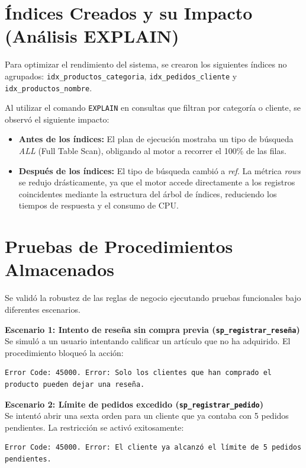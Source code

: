 \documentclass[11pt,a4paper]{article}
\begin{document}
\section{Índices Creados y su Impacto (Análisis EXPLAIN)}
Para optimizar el rendimiento del sistema, se crearon los siguientes índices no agrupados: \texttt{idx\_productos\_categoria}, \texttt{idx\_pedidos\_cliente} y \texttt{idx\_productos\_nombre}. 

Al utilizar el comando \texttt{EXPLAIN} en consultas que filtran por categoría o cliente, se observó el siguiente impacto:
\begin{itemize}
    \item \textbf{Antes de los índices:} El plan de ejecución mostraba un tipo de búsqueda \textit{ALL} (Full Table Scan), obligando al motor a recorrer el 100\% de las filas.
    \item \textbf{Después de los índices:} El tipo de búsqueda cambió a \textit{ref}. La métrica \textit{rows} se redujo drásticamente, ya que el motor accede directamente a los registros coincidentes mediante la estructura del árbol de índices, reduciendo los tiempos de respuesta y el consumo de CPU.
\end{itemize}

\section{Pruebas de Procedimientos Almacenados}
Se validó la robustez de las reglas de negocio ejecutando pruebas funcionales bajo diferentes escenarios.

\textbf{Escenario 1: Intento de reseña sin compra previa (\texttt{sp\_registrar\_reseña})} \\
Se simuló a un usuario intentando calificar un artículo que no ha adquirido. El procedimiento bloqueó la acción:
\begin{lstlisting}[numbers=none]
Error Code: 45000. Error: Solo los clientes que han comprado el producto pueden dejar una reseña.
\end{lstlisting}

\textbf{Escenario 2: Límite de pedidos excedido (\texttt{sp\_registrar\_pedido})} \\
Se intentó abrir una sexta orden para un cliente que ya contaba con 5 pedidos pendientes. La restricción se activó exitosamente:
\begin{lstlisting}[numbers=none]
Error Code: 45000. Error: El cliente ya alcanzó el límite de 5 pedidos pendientes.
\end{lstlisting}
\end{document}
